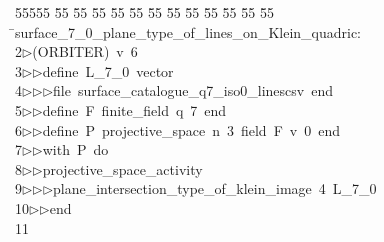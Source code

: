 %
%
\begin{tabbing}
55555 \= 55 \= 55 \= 55 \= 55 \= 55 \= 55 \= 55 \= 55 \= 55 \= 55 \= 55 \= 55 \= \>surface\_7\_0\_plane\_type\_of\_lines\_on\_Klein\_quadric:\\[0pt]
2\>$\triangleright$\>(ORBITER)\ v\ 6\ \\[0pt]
3\>$\triangleright$\>$\triangleright$\>define\ L\_7\_0\ vector\ \\[0pt]
4\>$\triangleright$\>$\triangleright$\>$\triangleright$\>file\ surface\_catalogue\_q7\_iso0\_linescsv\ end\ \\[0pt]
5\>$\triangleright$\>$\triangleright$\>define\ F\ finite\_field\ q\ 7\ end\ \\[0pt]
6\>$\triangleright$\>$\triangleright$\>define\ P\ projective\_space\ n\ 3\ field\ F\ v\ 0\ end\ \\[0pt]
7\>$\triangleright$\>$\triangleright$\>with\ P\ do\ \\[0pt]
8\>$\triangleright$\>$\triangleright$\>projective\_space\_activity\ \\[0pt]
9\>$\triangleright$\>$\triangleright$\>$\triangleright$\>plane\_intersection\_type\_of\_klein\_image\ 4\ L\_7\_0\ \\[0pt]
10\>$\triangleright$\>$\triangleright$\>end\ \\[0pt]
11\>\end{tabbing}
